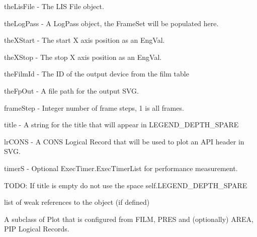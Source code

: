 \documentclass[letterpaper,10pt,english]{sphinxmanual}
\begin{document}
\begin{fulllineitems}
\begin{fulllineitems}
theLisFile - The LIS File object.

theLogPass - A LogPass object, the FrameSet will be populated here.

theXStart - The start X axis position as an EngVal.

theXStop - The stop X axis position as an EngVal.

theFilmId - The ID of the output device from the film table

theFpOut - A file path for the output SVG.

frameStep - Integer number of frame steps, 1 is all frames.

title - A string for the title that will appear in LEGEND\_DEPTH\_SPARE

lrCONS - A CONS Logical Record that will be used to plot an API header in SVG.

timerS - Optional ExecTimer.ExecTimerList for performance measurement.

TODO: If title is empty do not use the space self.LEGEND\_DEPTH\_SPARE

\end{fulllineitems}


\begin{fulllineitems}
\label{\detokenize{ref/util/plot/Plot:TotalDepth.util.plot.Plot.Plot.__weakref__}}
list of weak references to the object (if defined)

\end{fulllineitems}


\end{fulllineitems}


\begin{fulllineitems}
\label{\detokenize{ref/util/plot/Plot:TotalDepth.util.plot.Plot.PlotReadLIS}}
A subclass of Plot that is configured from FILM, PRES and (optionally) AREA, PIP Logical Records.

\end{fulllineitems}

\end{document}
